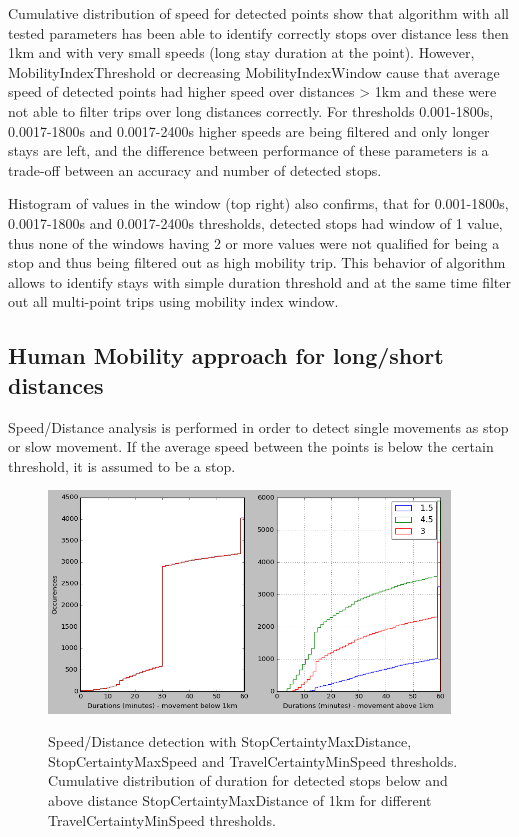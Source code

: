Cumulative distribution of speed for detected points show that algorithm with all tested parameters has been able to identify correctly stops over distance less then 1km and with very small speeds (long stay duration at the point). However, MobilityIndexThreshold or decreasing MobilityIndexWindow cause that average speed of detected points had higher speed over distances > 1km and these were not able to filter trips over long distances correctly. For thresholds 0.001-1800s, 0.0017-1800s and 0.0017-2400s higher speeds are being filtered and only longer stays are left, and the difference between performance of these parameters is a trade-off between an accuracy and number of detected stops. 

Histogram of values in the window (top right) also confirms, that for 0.001-1800s, 0.0017-1800s and 0.0017-2400s thresholds, detected stops had window of 1 value, thus none of the windows having 2 or more values were not qualified for being a stop and thus being filtered out as high mobility trip. This behavior of algorithm allows to identify stays with simple duration threshold and at the same time filter out all multi-point trips using mobility index window. 

\subsection{Human Mobility approach for long/short distances}

Speed/Distance analysis is performed in order to detect single movements as stop or slow movement. If the average speed between the points is below the certain threshold, it is assumed to be a stop. 
 
\begin{figure}[!ht]
	\centering
	\includegraphics[width=0.95\textwidth]{images/speed_dist_analy1.png}\\
	\caption{Speed/Distance detection with StopCertaintyMaxDistance, StopCertaintyMaxSpeed and TravelCertaintyMinSpeed thresholds. Cumulative distribution of duration for detected stops below and above distance StopCertaintyMaxDistance of 1km for different  TravelCertaintyMinSpeed thresholds.}
	\label{fig:speed_dist_analy1}
\end{figure}
\FloatBarrier 

